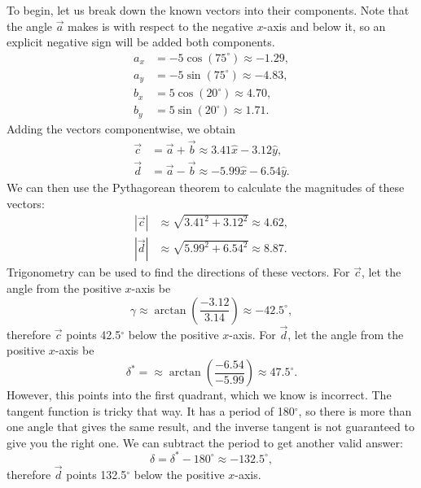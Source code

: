 \documentclass[]{article}
\begin{document}
To begin, let us break down the known vectors into their components. Note that the angle $\vec{a}$ makes is with respect to the negative $x$-axis and below it, so an explicit negative sign will be added both components.
\[
\begin{split}
	a_{x} & = -5\cos(75^{\circ}) \approx -1.29, \\
	a_{y} & = -5\sin(75^{\circ}) \approx -4.83, \\
	b_{x} & = 5\cos(20^{\circ}) \approx 4.70, \\
	b_{y} & = 5\sin(20^{\circ}) \approx 1.71.
\end{split}
\]
Adding the vectors componentwise, we obtain
\[
\begin{split}
	\vec{c} & = \vec{a}+\vec{b} \approx 3.41 \hat{x} - 3.12 \hat{y}, \\
	\vec{d} & = \vec{a}-\vec{b} \approx -5.99 \hat{x} - 6.54 \hat{y}.
\end{split}
\]
We can then use the Pythagorean theorem to calculate the magnitudes of these vectors:
\[
\begin{split}
	|\vec{c}| & \approx \sqrt{3.41^{2}+3.12^{2}} \approx 4.62, \\
	|\vec{d}| & \approx \sqrt{5.99^{2}+6.54^{2}} \approx 8.87.
\end{split}
\]
Trigonometry can be used to find the directions of these vectors. For $\vec{c}$, let the angle from the positive $x$-axis be
\[
\gamma \approx \arctan\left(\frac{-3.12}{3.14}\right) \approx -42.5^{\circ},
\]
therefore $\vec{c}$ points 42.5$^{\circ}$ below the positive $x$-axis. For $\vec{d}$, let the angle from the positive $x$-axis be
\[
\delta^{*} = \approx \arctan\left(\frac{-6.54}{-5.99}\right) \approx 47.5^{\circ}.
\]
However, this points into the first quadrant, which we know is incorrect. The tangent function is tricky that way. It has a period of 180$^{\circ}$, so there is more than one angle that gives the same result, and the inverse tangent is not guaranteed to give you the right one. We can subtract the period to get another valid answer:
\[
\delta = \delta^{*} - 180^{\circ} \approx -132.5^{\circ},
\]
therefore $\vec{d}$ points 132.5$^{\circ}$ below the positive $x$-axis.
\end{document}
